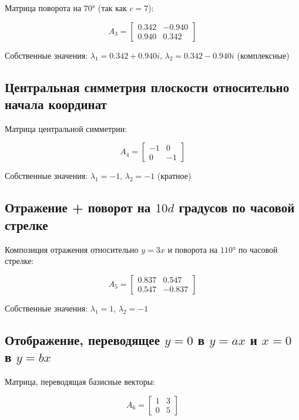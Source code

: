 Матрица поворота на $70°$ (так как $c = 7$):

\begin{equation}
A_3 = \begin{bmatrix} 0.342 & -0.940 \\ 0.940 & 0.342 \end{bmatrix}
\end{equation}

Собственные значения: $\lambda_1 = 0.342 + 0.940i$, $\lambda_2 = 0.342 - 0.940i$ (комплексные)

\subsection*{Центральная симметрия плоскости относительно начала координат}

Матрица центральной симметрии:

\begin{equation}
A_4 = \begin{bmatrix} -1 & 0 \\ 0 & -1 \end{bmatrix}
\end{equation}

Собственные значения: $\lambda_1 = -1$, $\lambda_2 = -1$ (кратное)

\subsection*{Отражение + поворот на $10d$ градусов по часовой стрелке}

Композиция отражения относительно $y = 3x$ и поворота на $110°$ по часовой стрелке:

\begin{equation}
A_5 = \begin{bmatrix} 0.837 & 0.547 \\ 0.547 & -0.837 \end{bmatrix}
\end{equation}

Собственные значения: $\lambda_1 = 1$, $\lambda_2 = -1$

\subsection*{Отображение, переводящее $y = 0$ в $y = ax$ и $x = 0$ в $y = bx$}

Матрица, переводящая базисные векторы:

\begin{equation}
A_6 = \begin{bmatrix} 1 & 3 \\ 0 & 5 \end{bmatrix}
\end{equation}

